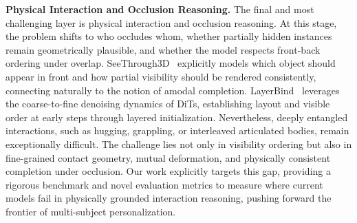 \textbf{Physical Interaction and Occlusion Reasoning.} 
The final and most challenging layer is physical interaction and occlusion reasoning. At this stage, the problem shifts to who occludes whom, whether partially hidden instances remain geometrically plausible, and whether the model respects front-back ordering under overlap. SeeThrough3D~\cite{seethrough3d2024} explicitly models which object should appear in front and how partial visibility should be rendered consistently, connecting naturally to the notion of amodal completion. LayerBind~\cite{chen2026layer} leverages the coarse-to-fine denoising dynamics of DiTs, establishing layout and visible order at early steps through layered initialization. Nevertheless, deeply entangled interactions, such as hugging, grappling, or interleaved articulated bodies, remain exceptionally difficult. The challenge lies not only in visibility ordering but also in fine-grained contact geometry, mutual deformation, and physically consistent completion under occlusion. Our work explicitly targets this gap, providing a rigorous benchmark and novel evaluation metrics to measure where current models fail in physically grounded interaction reasoning, pushing forward the frontier of multi-subject personalization.
